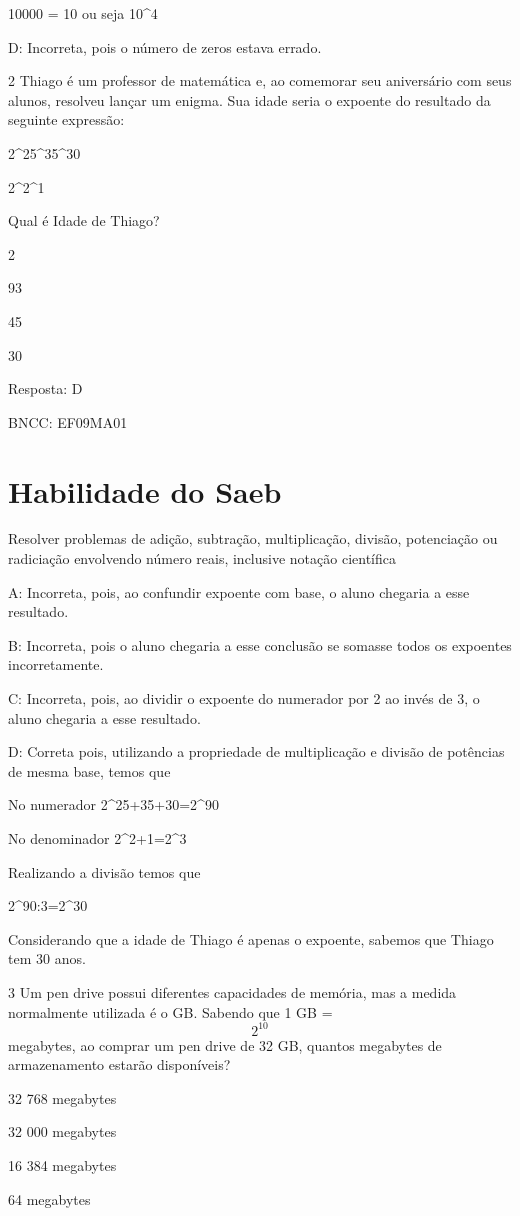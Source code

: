 10000 = 10 ou seja 10^4

D: Incorreta, pois o número de zeros estava errado.


\num{2} Thiago é um professor de matemática e, ao comemorar seu aniversário
com seus alunos, resolveu lançar um enigma. Sua idade seria o expoente
do resultado da seguinte expressão:

2^25^35^30

2^2^1

Qual é Idade de Thiago?

\item 2
\item 93
\item 45
\item 30

Resposta: D

BNCC: EF09MA01

\section{Habilidade do Saeb}

Resolver problemas de adição, subtração, multiplicação, divisão,
potenciação ou radiciação envolvendo número reais, inclusive notação
científica

A: Incorreta, pois, ao confundir expoente com base, o aluno chegaria a
esse resultado.

B: Incorreta, pois o aluno chegaria a esse conclusão se somasse todos os
expoentes incorretamente.

C: Incorreta, pois, ao dividir o expoente do numerador por 2 ao invés de
3, o aluno chegaria a esse resultado.

D: Correta pois, utilizando a propriedade de multiplicação e divisão de
potências de mesma base, temos que


No numerador 2^25+35+30=2^90

No denominador 2^2+1=2^3

Realizando a divisão temos que

2^90:3=2^30

Considerando que a idade de Thiago é apenas o expoente, sabemos que
Thiago tem 30 anos.

\num{3}  Um pen drive possui diferentes capacidades de memória, mas a medida
normalmente utilizada é o GB. Sabendo que 1 GB = \[2^{10}\] megabytes,
ao comprar um pen drive de 32 GB, quantos megabytes de armazenamento
estarão disponíveis?

\item 32 768 megabytes
\item 32 000 megabytes
\item 16 384 megabytes
\item 64 megabytes

